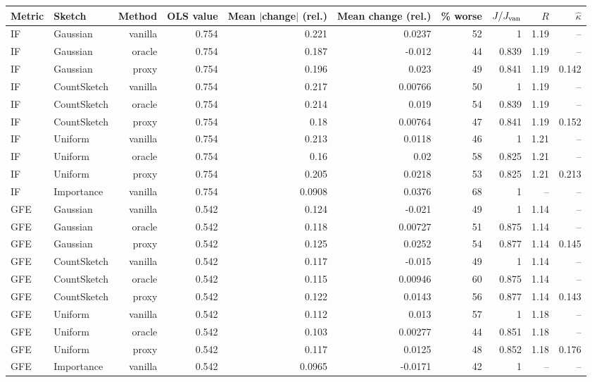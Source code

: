 \begin{table}[t]
\centering
\small
\begin{tabular}{llrrrrrrrr}
\toprule
Metric & Sketch & Method & OLS value & Mean $|$change$|$ (rel.) & Mean change (rel.) & \% worse & $J/J_{\rm van}$ & $R$ & $\hat\kappa$ \\
\midrule
IF & Gaussian & vanilla & 0.754 & 0.221 & 0.0237 & 52 & 1 & 1.19 & -- \\
IF & Gaussian & oracle & 0.754 & 0.187 & -0.012 & 44 & 0.839 & 1.19 & -- \\
IF & Gaussian & proxy & 0.754 & 0.196 & 0.023 & 49 & 0.841 & 1.19 & 0.142 \\
IF & CountSketch & vanilla & 0.754 & 0.217 & 0.00766 & 50 & 1 & 1.19 & -- \\
IF & CountSketch & oracle & 0.754 & 0.214 & 0.019 & 54 & 0.839 & 1.19 & -- \\
IF & CountSketch & proxy & 0.754 & 0.18 & 0.00764 & 47 & 0.841 & 1.19 & 0.152 \\
IF & Uniform & vanilla & 0.754 & 0.213 & 0.0118 & 46 & 1 & 1.21 & -- \\
IF & Uniform & oracle & 0.754 & 0.16 & 0.02 & 58 & 0.825 & 1.21 & -- \\
IF & Uniform & proxy & 0.754 & 0.205 & 0.0218 & 53 & 0.825 & 1.21 & 0.213 \\
IF & Importance & vanilla & 0.754 & 0.0908 & 0.0376 & 68 & 1 & -- & -- \\
\midrule
GFE & Gaussian & vanilla & 0.542 & 0.124 & -0.021 & 49 & 1 & 1.14 & -- \\
GFE & Gaussian & oracle & 0.542 & 0.118 & 0.00727 & 51 & 0.875 & 1.14 & -- \\
GFE & Gaussian & proxy & 0.542 & 0.125 & 0.0252 & 54 & 0.877 & 1.14 & 0.145 \\
GFE & CountSketch & vanilla & 0.542 & 0.117 & -0.015 & 49 & 1 & 1.14 & -- \\
GFE & CountSketch & oracle & 0.542 & 0.115 & 0.00946 & 60 & 0.875 & 1.14 & -- \\
GFE & CountSketch & proxy & 0.542 & 0.122 & 0.0143 & 56 & 0.877 & 1.14 & 0.143 \\
GFE & Uniform & vanilla & 0.542 & 0.112 & 0.013 & 57 & 1 & 1.18 & -- \\
GFE & Uniform & oracle & 0.542 & 0.103 & 0.00277 & 44 & 0.851 & 1.18 & -- \\
GFE & Uniform & proxy & 0.542 & 0.117 & 0.0125 & 48 & 0.852 & 1.18 & 0.176 \\
GFE & Importance & vanilla & 0.542 & 0.0965 & -0.0171 & 42 & 1 & -- & -- \\

\end{tabular}
\end{table}
